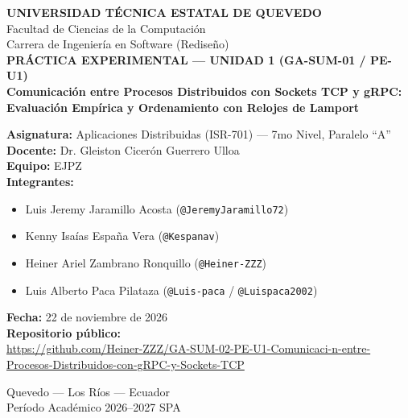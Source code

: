 \documentclass[12pt,a4paper]{article}
\begin{document}
\begin{titlepage}
  \centering
  \vspace*{0.8cm}
  {\Large \textbf{UNIVERSIDAD TÉCNICA ESTATAL DE QUEVEDO}}\\[0.25cm]
  {\large Facultad de Ciencias de la Computación}\\[0.15cm]
  {\large Carrera de Ingeniería en Software (Rediseño)}\\[1.5cm]

  {\large \textbf{PRÁCTICA EXPERIMENTAL — UNIDAD 1 (GA-SUM-01 / PE-U1)}}\\[0.5cm]
  {\LARGE \textbf{Comunicación entre Procesos Distribuidos con Sockets TCP y gRPC: Evaluación Empírica y Ordenamiento con Relojes de Lamport}}\\[1.5cm]

  \begin{flushleft}
    \textbf{Asignatura:} Aplicaciones Distribuidas (ISR-701) — 7mo Nivel, Paralelo ``A''\\[0.25cm]
    \textbf{Docente:} Dr. Gleiston Cicerón Guerrero Ulloa\\[0.25cm]
    \textbf{Equipo:} EJPZ\\[0.25cm]
    \textbf{Integrantes:}
    \begin{itemize}
      \item Luis Jeremy Jaramillo Acosta (\texttt{@JeremyJaramillo72})
      \item Kenny Isaías España Vera (\texttt{@Kespanav})
      \item Heiner Ariel Zambrano Ronquillo (\texttt{@Heiner-ZZZ})
      \item Luis Alberto Paca Pilataza (\texttt{@Luis-paca} / \texttt{@Luispaca2002})
    \end{itemize}
    \textbf{Fecha:} 22 de noviembre de 2026\\[0.25cm]
    \textbf{Repositorio público:}\\
    {\footnotesize \url{https://github.com/Heiner-ZZZ/GA-SUM-02-PE-U1-Comunicaci-n-entre-Procesos-Distribuidos-con-gRPC-y-Sockets-TCP}}
  \end{flushleft}

  \vfill
  Quevedo — Los Ríos — Ecuador\\
  Período Académico 2026--2027 SPA
\end{titlepage}

\tableofcontents
\newpage

\end{document}
